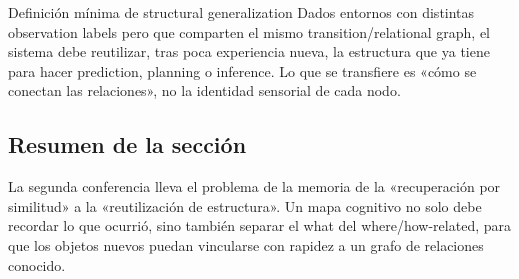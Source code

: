 \begin{importantbox}{Definición mínima de structural generalization}
Dados entornos con distintas observation labels pero que comparten el mismo transition/relational graph, el sistema debe reutilizar, tras poca experiencia nueva, la estructura que ya tiene para hacer prediction, planning o inference. Lo que se transfiere es «cómo se conectan las relaciones», no la identidad sensorial de cada nodo.
\end{importantbox}

\subsection{Resumen de la sección}

La segunda conferencia lleva el problema de la memoria de la «recuperación por similitud» a la «reutilización de estructura». Un mapa cognitivo no solo debe recordar lo que ocurrió, sino también separar el what del where/how-related, para que los objetos nuevos puedan vincularse con rapidez a un grafo de relaciones conocido.
